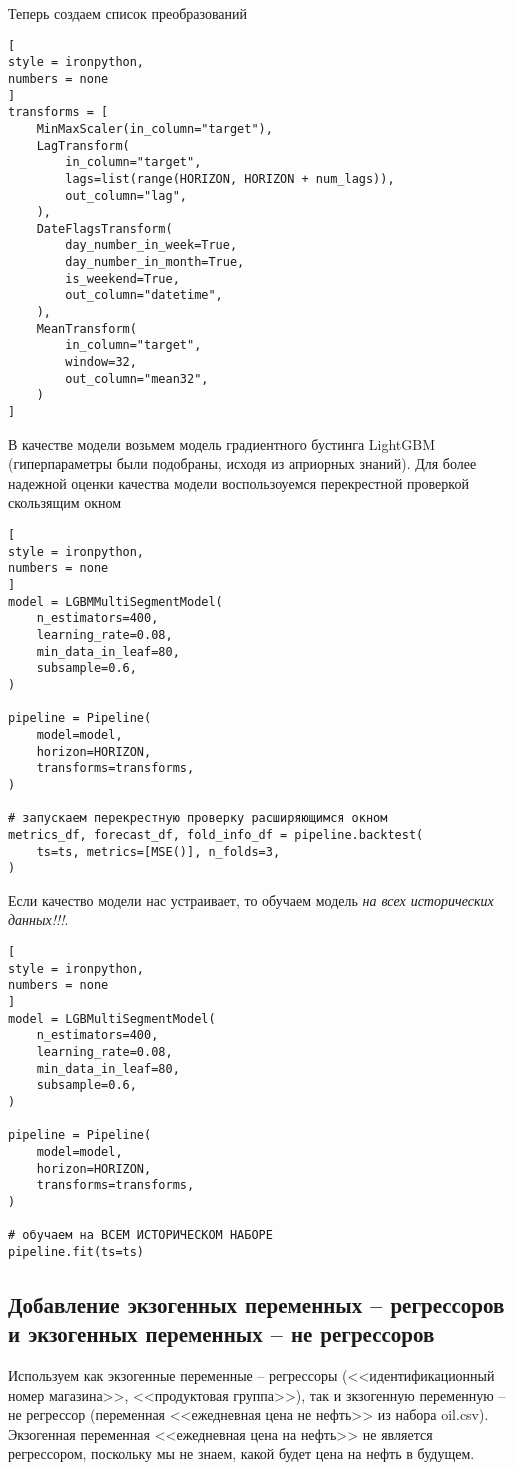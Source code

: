 \documentclass[%
	11pt,
	a4paper,
	utf8,
		]{article}
\begin{document}
Теперь создаем список преобразований
\begin{lstlisting}[
style = ironpython,
numbers = none
]
transforms = [
    MinMaxScaler(in_column="target"),
    LagTransform(
        in_column="target",
        lags=list(range(HORIZON, HORIZON + num_lags)),
        out_column="lag",
    ),
    DateFlagsTransform(
        day_number_in_week=True,
        day_number_in_month=True,
        is_weekend=True,
        out_column="datetime",
    ),
    MeanTransform(
        in_column="target",
        window=32,
        out_column="mean32",
    )
]
\end{lstlisting}

В качестве модели возьмем модель градиентного бустинга LightGBM (гиперпараметры были подобраны, исходя из априорных знаний). Для более надежной оценки качества модели воспользоуемся перекрестной проверкой скользящим окном
\begin{lstlisting}[
style = ironpython,
numbers = none	
]
model = LGBMMultiSegmentModel(
    n_estimators=400,
    learning_rate=0.08,
    min_data_in_leaf=80,
    subsample=0.6,
)

pipeline = Pipeline(
    model=model,
    horizon=HORIZON,
    transforms=transforms,
)

# запускаем перекрестную проверку расширяющимся окном
metrics_df, forecast_df, fold_info_df = pipeline.backtest(
    ts=ts, metrics=[MSE()], n_folds=3,
)
\end{lstlisting}

Если качество модели нас устраивает, то обучаем модель \emph{\color{blue}на всех исторических данных!!!}.
\begin{lstlisting}[
style = ironpython,
numbers = none
]
model = LGBMultiSegmentModel(
    n_estimators=400,
    learning_rate=0.08,
    min_data_in_leaf=80,
    subsample=0.6,
)

pipeline = Pipeline(
    model=model,
    horizon=HORIZON,
    transforms=transforms,
)

# обучаем на ВСЕМ ИСТОРИЧЕСКОМ НАБОРЕ
pipeline.fit(ts=ts)
\end{lstlisting}

\subsection{Добавление экзогенных переменных -- регрессоров и экзогенных переменных -- не регрессоров}

Используем как экзогенные переменные -- регрессоры (<<идентификационный номер магазина>>, <<продуктовая группа>>), так и зкзогенную переменную -- не регрессор (переменная <<ежедневная цена не нефть>> из набора oil.csv). Экзогенная переменная <<ежедневная цена на нефть>> не является регрессором, поскольку мы не знаем, какой будет цена на нефть в будущем.
\end{document}
